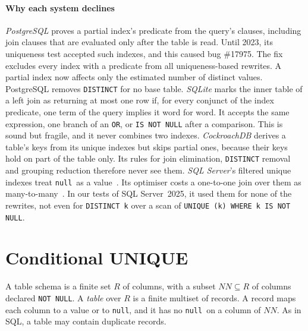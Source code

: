 \documentclass[conference]{IEEEtran}
\theoremstyle{definition}
\newcommand{\sql}[1]{\texttt{#1}}
\newcommand{\nul}{\texttt{null}}
\newcommand{\NN}{\mathit{NN}}
\begin{document}
\else
\paragraph*{Why each system declines} \emph{PostgreSQL} proves a partial index's predicate from the query's clauses,
including join clauses that are evaluated only after the table is read. Until 2023, its uniqueness test accepted such
indexes, and this caused bug \#17975. The fix excludes every index with a predicate from all uniqueness-based rewrites.
A partial index now affects only the estimated number of distinct values. PostgreSQL removes \sql{DISTINCT} for no base
table. \emph{SQLite} marks the inner table of a left join as returning at most one row if, for every conjunct of the
index predicate, one term of the query implies it word for word. It accepts the same expression, one branch of an
\sql{OR}, or \sql{IS NOT NULL} after a comparison. This is sound but fragile, and it never combines two indexes.
\emph{CockroachDB} derives a table's keys from its unique indexes but skips partial ones, because their keys hold on part
of the table only. Its rules for join elimination, \sql{DISTINCT} removal and grouping reduction therefore never see
them. \emph{SQL Server}'s filtered unique indexes treat \nul\ as a value~\cite{SQLServerDoc}. Its optimiser costs a
one-to-one join over them as many-to-many~\cite{White13}. In our tests of SQL Server~2025, it used them for none of the
rewrites, not even for \sql{DISTINCT k} over a scan of \sql{UNIQUE (k) WHERE k IS NOT NULL}.


\fi
\section{Conditional UNIQUE}\label{sec:model}

A table schema is a finite set $R$ of columns, with a subset $\NN\subseteq R$ of columns declared \sql{NOT NULL}. A
\emph{table} over $R$ is a finite multiset of records. A record maps each column to a value or to \nul, and it has no
\nul\ on a column of $\NN$. As in SQL, a table may contain duplicate records.
\end{document}
